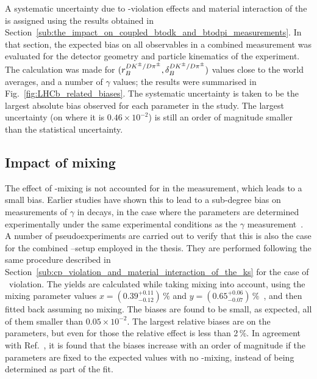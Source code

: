 A systematic uncertainty due to \CP-violation effects and material interaction of the \KS is assigned using the results obtained in Section~\ref{sub:the_impact_on_coupled_btodk_and_btodpi_measurements}. In that section, the expected bias on all observables in a combined \BtoDh measurement was evaluated for the detector geometry and particle kinematics of the \lhcb experiment. The calculation was made for $(r_B^{{{D}{{K}^\pm}}/D\pi^\pm},\delta_B^{{{D}{{K}^\pm}}/D\pi^\pm})$ values close to the world averages, and a number of $\gamma$ values; the results were summarised in Fig.~\ref{fig:LHCb_related_biases}. 
The systematic uncertainty is taken to be the largest absolute bias observed for each parameter in the study. The largest uncertainty (on \yxidpi where it is $0.46\times 10^{-2}$) is still an order of magnitude smaller than the statistical uncertainty.
 


\subsection{Impact of \D mixing} %
\label{sub:impact_of_d_mixing}

The effect of \D-mixing is not accounted for in the measurement, which leads to a small bias. Earlier studies have shown this to lead to a sub-degree bias on measurements of $\gamma$ in \BtoDK decays, in the case where the \Fi parameters are determined experimentally under the same experimental conditions as the $\gamma$ measurement~\cite{Dmixing}. A number of pseudoexperiments are carried out to verify that this is also the case for the combined \DK--\Dpi setup employed in the thesis. They are performed following the same procedure described in Section~\ref{sub:cp_violation_and_material_interaction_of_the_ks} for the case of \KS\, \CP violation. The yields are calculated while taking \D mixing into account, using the mixing parameter values $x=(0.39^{+0.11}_{-0.12})\,\%$ and $y=(0.65^{+0.06}_{-0.07})\,\%$~\cite{PDG2020}, and then fitted back assuming no \D mixing. The biases are found to be small, as expected, all of them smaller than $0.05\times 10^{-2}$. The largest relative biases are on the \BtoDpi parameters, but even for those the relative effect is less than 2\,\%. In agreement with Ref.~\cite{Dmixing}, it is found that the biases increase with an order of magnitude if the \Fi parameters are fixed to the expected values with no \D-mixing, instead of being determined as part of the fit.

